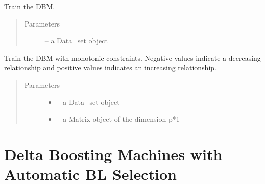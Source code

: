 \documentclass[letterpaper,10pt,english]{sphinxmanual}
\begin{document}
\begin{fulllineitems}

\begin{fulllineitems}
\label{\detokenize{index:dbm_py.interface.DBM.train}}
Train the DBM.
\begin{quote}\begin{description}
\item[{Parameters}] \leavevmode
{} -- a Data\_set object

\end{description}\end{quote}

\end{fulllineitems}


\begin{fulllineitems}
\label{\detokenize{index:dbm_py.interface.DBM.train_with_monotonic_constraints}}
Train the DBM with monotonic constraints. Negative values
indicate a decreasing relationship and positive values indicates
an increasing relationship.
\begin{quote}\begin{description}
\item[{Parameters}] \leavevmode\begin{itemize}
\item {} 
 -- a Data\_set object

\item {} 
 -- a Matrix object of the dimension p*1

\end{itemize}

\end{description}\end{quote}

\end{fulllineitems}


\end{fulllineitems}



\section{Delta Boosting Machines with Automatic BL Selection}
\label{\detokenize{index:delta-boosting-machines-with-automatic-bl-selection}}
\end{document}
